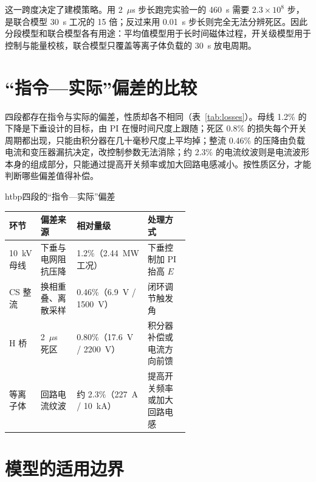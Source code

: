 这一跨度决定了建模策略。用 2~$\mu$s 步长跑完实验一的 460~s 需要 $2.3\times10^8$ 步，是联合模型 30~s 工况的 15 倍；反过来用 0.01~s 步长则完全无法分辨死区。因此分段模型和联合模型各有用途：平均值模型用于长时间磁体过程，开关级模型用于控制与能量校核，联合模型只覆盖等离子体负载的 30~s 放电周期。

\section{“指令—实际”偏差的比较}

四段都存在指令与实际的偏差，性质却各不相同（表~\ref{tab:losses}）。母线 1.2\% 的下降是下垂设计的目标，由 PI 在慢时间尺度上跟随；死区 0.8\% 的损失每个开关周期都出现，只能由积分器在几十毫秒尺度上平均掉；整流 0.46\% 的压降由负载电流和变压器漏抗决定，改控制参数无法消除；约 2.3\% 的电流纹波则是电流波形本身的组成部分，只能通过提高开关频率或加大回路电感减小。按性质区分，才能判断哪些偏差值得补偿。

\begin{dtable}{htbp}{四段的“指令—实际”偏差}
\label{tab:losses}
\begin{tabularx}{\linewidth}{P{0.12\linewidth}P{0.2\linewidth}P{0.27\linewidth}L}
\toprule
\headrow 环节 & 偏差来源 & 相对量级 & 处理方式 \\
~kV 母线 & 下垂与电网阻抗压降 & 1.2\%（2.44~MW 工况） & 下垂控制加 PI 抬高 $E$ \\
CS 整流 & 换相重叠、离散采样 & 0.46\%（6.9~V / 1500~V） & 闭环调节触发角 \\
H 桥 & 2~$\mu$s 死区 & 0.80\%（17.6~V / 2200~V） & 积分器补偿或电流方向前馈 \\
等离子体 & 回路电流纹波 & 约 2.3\%（227~A / 10~kA） & 提高开关频率或加大回路电感 \\
\bottomrule
\end{tabularx}
\end{dtable}

\section{模型的适用边界}

